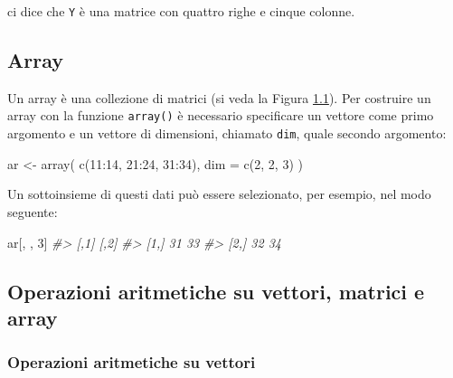 \documentclass[
]{memoir}
\newenvironment{Shaded}{\begin{snugshade}}{\end{snugshade}}
\newcommand{\AttributeTok}[1]{\textcolor[rgb]{0.77,0.63,0.00}{#1}}
\newcommand{\CommentTok}[1]{\textcolor[rgb]{0.56,0.35,0.01}{\textit{#1}}}
\newcommand{\DecValTok}[1]{\textcolor[rgb]{0.00,0.00,0.81}{#1}}
\newcommand{\FunctionTok}[1]{\textcolor[rgb]{0.00,0.00,0.00}{#1}}
\newcommand{\NormalTok}[1]{#1}
\newcommand{\OtherTok}[1]{\textcolor[rgb]{0.56,0.35,0.01}{#1}}
\newcommand{\SpecialCharTok}[1]{\textcolor[rgb]{0.00,0.00,0.00}{#1}}
\theoremstyle{definition}
\theoremstyle{definition}
\theoremstyle{definition}
\theoremstyle{definition}
\theoremstyle{remark}
\begin{document}
ci dice che \texttt{Y} è una matrice con quattro righe e cinque colonne.

\hypertarget{array}{%
\subsection{Array}\label{array}}

Un array è una collezione di matrici (si veda la
Figura \protect\hyperlink{fig:R_data_structures}{1.1}). Per costruire un array con la
funzione \texttt{array()} è necessario specificare un vettore come primo
argomento e un vettore di dimensioni, chiamato \texttt{dim}, quale secondo
argomento:

\begin{Shaded}
\begin{Highlighting}[]
\NormalTok{ar }\OtherTok{\textless{}{-}} \FunctionTok{array}\NormalTok{(}
  \FunctionTok{c}\NormalTok{(}\DecValTok{11}\SpecialCharTok{:}\DecValTok{14}\NormalTok{, }\DecValTok{21}\SpecialCharTok{:}\DecValTok{24}\NormalTok{, }\DecValTok{31}\SpecialCharTok{:}\DecValTok{34}\NormalTok{),}
  \AttributeTok{dim =} \FunctionTok{c}\NormalTok{(}\DecValTok{2}\NormalTok{, }\DecValTok{2}\NormalTok{, }\DecValTok{3}\NormalTok{)}
\NormalTok{)}
\end{Highlighting}
\end{Shaded}

Un sottoinsieme di questi dati può essere selezionato, per esempio, nel
modo seguente:

\begin{Shaded}
\begin{Highlighting}[]
\NormalTok{ar[, , }\DecValTok{3}\NormalTok{]}
\CommentTok{\#\textgreater{}      [,1] [,2]}
\CommentTok{\#\textgreater{} [1,]   31   33}
\CommentTok{\#\textgreater{} [2,]   32   34}
\end{Highlighting}
\end{Shaded}

\hypertarget{operazioni-aritmetiche-su-vettori-matrici-e-array}{%
\subsection{Operazioni aritmetiche su vettori, matrici e array}\label{operazioni-aritmetiche-su-vettori-matrici-e-array}}

\hypertarget{operazioni-aritmetiche-su-vettori}{%
\subsubsection{Operazioni aritmetiche su vettori}\label{operazioni-aritmetiche-su-vettori}}
\end{document}
